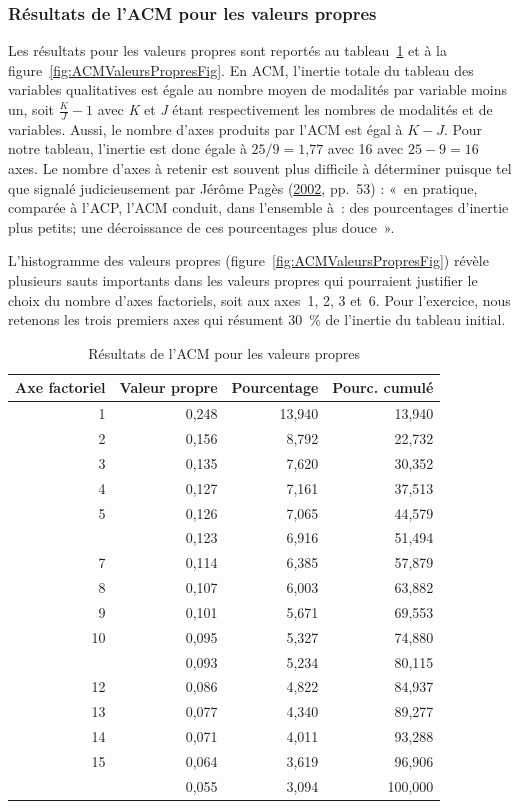 \documentclass[
  11pt,
  french,
]{book}
\begin{document}
\hypertarget{sect12411}{%
\subsubsection{Résultats de l'ACM pour les valeurs propres}\label{sect12411}}

Les résultats pour les valeurs propres sont reportés au tableau~\ref{tab:ACMValeursPropresTab} et à la figure~\ref{fig:ACMValeursPropresFig}.
En ACM, l'inertie totale du tableau des variables qualitatives est égale au nombre moyen de modalités par variable moins un, soit \(\frac{K}{J}-1\) avec \emph{K} et \emph{J} étant respectivement les nombres de modalités et de variables. Aussi, le nombre d'axes produits par l'ACM est égal à \(K - J\). Pour notre tableau, l'inertie est donc égale à \(\mbox{25} / \mbox{9} = \mbox{1,77}\) avec 16 avec \(\mbox{25}-\mbox{9} = \mbox{16}\) axes. Le nombre d'axes à retenir est souvent plus difficile à déterminer puisque tel que signalé judicieusement par Jérôme Pagès (\protect\hyperlink{ref-pages2002analyse}{2002}, pp.~53) : «~en pratique, comparée à l'ACP, l'ACM conduit, dans l'ensemble à~: des pourcentages d'inertie plus petits; une décroissance de ces pourcentages plus douce~».

L'histogramme des valeurs propres (figure~\ref{fig:ACMValeursPropresFig}) révèle plusieurs sauts importants dans les valeurs propres qui pourraient justifier le choix du nombre d'axes factoriels, soit aux axes~1, 2, 3 et~6. Pour l'exercice, nous retenons les trois premiers axes qui résument 30~\% de l'inertie du tableau initial.

\begin{table}

\caption{\label{tab:ACMValeursPropresTab}Résultats de l'ACM pour les valeurs propres}
\centering
\fontsize{8}{10}\selectfont
\begin{tabular}[t]{rrrr}
\toprule
Axe factoriel & Valeur propre & Pourcentage & Pourc. cumulé\\
\midrule
1 & 0,248 & 13,940 & 13,940\\
2 & 0,156 & 8,792 & 22,732\\
3 & 0,135 & 7,620 & 30,352\\
4 & 0,127 & 7,161 & 37,513\\
5 & 0,126 & 7,065 & 44,579\\
\addlinespace
6 & 0,123 & 6,916 & 51,494\\
7 & 0,114 & 6,385 & 57,879\\
8 & 0,107 & 6,003 & 63,882\\
9 & 0,101 & 5,671 & 69,553\\
10 & 0,095 & 5,327 & 74,880\\
\addlinespace
11 & 0,093 & 5,234 & 80,115\\
12 & 0,086 & 4,822 & 84,937\\
13 & 0,077 & 4,340 & 89,277\\
14 & 0,071 & 4,011 & 93,288\\
15 & 0,064 & 3,619 & 96,906\\
\addlinespace
16 & 0,055 & 3,094 & 100,000\\
\bottomrule
\end{tabular}
\end{table}
\end{document}
